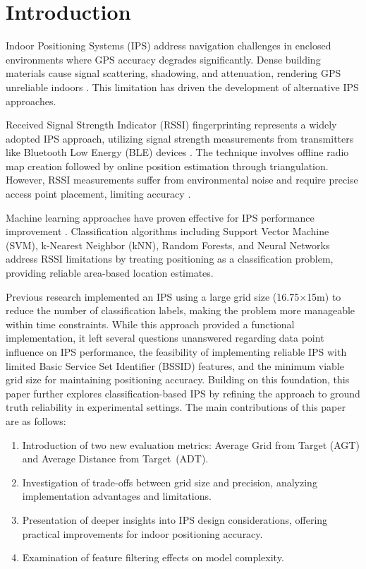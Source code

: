 \documentclass[runningheads]{llncs}
\begin{document}
\section{Introduction}
Indoor Positioning Systems (IPS) address navigation challenges in enclosed environments where GPS accuracy degrades significantly. Dense building materials cause signal scattering, shadowing, and attenuation, rendering GPS unreliable indoors \cite{bgp1}. This limitation has driven the development of alternative IPS approaches.

Received Signal Strength Indicator (RSSI) fingerprinting represents a widely adopted IPS approach, utilizing signal strength measurements from transmitters like Bluetooth Low Energy (BLE) devices \cite{bg2}. The technique involves offline radio map creation followed by online position estimation through triangulation. However, RSSI measurements suffer from environmental noise and require precise access point placement, limiting accuracy \cite{bgp2}.

Machine learning approaches have proven effective for IPS performance improvement \cite{bgp3}. Classification algorithms including Support Vector Machine (SVM), k-Nearest Neighbor (kNN), Random Forests, and Neural Networks address RSSI limitations by treating positioning as a classification problem, providing reliable area-based location estimates.

Previous research implemented an IPS using a large grid size (16.75$\times$15m) to reduce the number of classification labels, making the problem more manageable within time constraints. While this approach provided a functional implementation, it left several questions unanswered regarding data point influence on IPS performance, the feasibility of implementing reliable IPS with limited Basic Service Set Identifier (BSSID) features, and the minimum viable grid size for maintaining positioning accuracy.
Building on this foundation, this paper further explores classification-based IPS by refining the approach to ground truth reliability in experimental settings. The main contributions of this paper are as follows:
\begin{enumerate}
	\item Introduction of two new evaluation metrics: Average Grid from Target (AGT) and Average Distance from Target~(ADT).
	\item Investigation of trade-offs between grid size and precision, analyzing implementation advantages and limitations.
	\item Presentation of deeper insights into IPS design considerations, offering practical improvements for indoor positioning accuracy.
	\item Examination of feature filtering effects on model complexity.
\end{enumerate}
\end{document}

